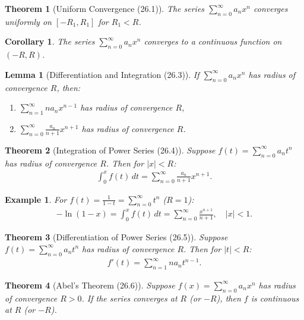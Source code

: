 \documentclass[7pt]{article}
\theoremstyle{definition}
\theoremstyle{plain}
\newtheorem{theorem}{Theorem}
\newtheorem{example}{Example}
\newtheorem{corollary}{Corollary}
\newtheorem{lemma}{Lemma}
\begin{document}
\begin{theorem}[Uniform Convergence (26.1)]
The series $ \sum_{n=0}^\infty a_n x^n $ converges uniformly on $ [-R_1, R_1] $ for $ R_1 < R $.
\end{theorem}

\begin{corollary}
The series $ \sum_{n=0}^\infty a_n x^n $ converges to a continuous function on $ (-R, R) $.
\end{corollary}

\begin{lemma}[Differentiation and Integration (26.3)]
If $ \sum_{n=0}^\infty a_n x^n $ has radius of convergence $ R $, then:
\begin{enumerate}
    \item $ \sum_{n=1}^\infty n a_n x^{n-1} $ has radius of convergence $ R $,
    \item $ \sum_{n=0}^\infty \frac{a_n}{n+1} x^{n+1} $ has radius of convergence $ R $.
\end{enumerate}
\end{lemma}

\begin{theorem}[Integration of Power Series (26.4)]
Suppose $ f(t) = \sum_{n=0}^\infty a_n t^n $ has radius of convergence $ R $. Then for $ |x| < R $:
\begin{align}
\int_0^x f(t) \, dt = \sum_{n=0}^\infty \frac{a_n}{n+1} x^{n+1}.
\end{align}
\end{theorem}

\begin{example}
For $ f(t) = \frac{1}{1-t} = \sum_{n=0}^\infty t^n $ ($ R = 1 $):
\begin{align}
-\ln(1-x) = \int_0^x f(t) \, dt = \sum_{n=0}^\infty \frac{x^{n+1}}{n+1}, \quad |x| < 1.
\end{align}
\end{example}

\begin{theorem}[Differentiation of Power Series (26.5)]
Suppose $ f(t) = \sum_{n=0}^\infty a_n t^n $ has radius of convergence $ R $. Then for $ |t| < R $:
\begin{align}
f'(t) = \sum_{n=1}^\infty n a_n t^{n-1}.
\end{align}
\end{theorem}

\begin{theorem}[Abel’s Theorem (26.6)]
Suppose $ f(x) = \sum_{n=0}^\infty a_n x^n $ has radius of convergence $ R > 0 $. If the series converges at $ R $ (or $ -R $), then $ f $ is continuous at $ R $ (or $ -R $).
\end{theorem}
\end{document}
